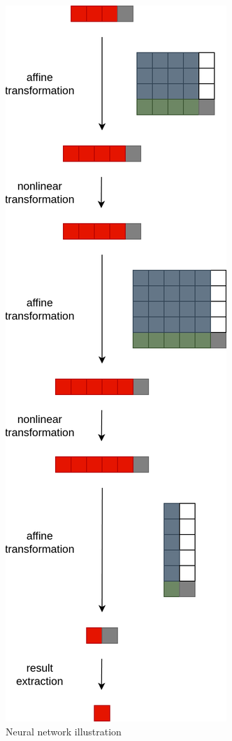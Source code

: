 \begin{figure}[!htbp]
	\centering
	\includegraphics[scale=0.3]{../images/nn.png}
	\caption{Neural network illustration}
    \label{fig:nn}
\end{figure}

